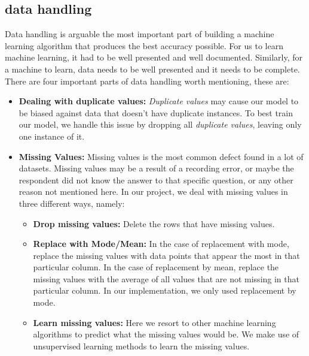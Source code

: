 \subsection{data handling}
Data handling is arguable the most important part of building a machine learning algorithm that produces the best accuracy possible. For us to learn machine learning, it had to be well presented and well documented. Similarly, for a machine to learn, data needs to be well presented and it needs to be complete. There are four important parts of data handling worth mentioning, these are: 
\begin{itemize}
    \item \textbf{Dealing with duplicate values: }\textit{Duplicate values} may cause our model to be biased against data that doesn't have duplicate instances. To best train our model, we handle this issue by dropping all \textit{duplicate values}, leaving only one instance of it.
    \item \textbf{Missing Values: }Missing values is the most common defect found in a lot of datasets. Missing values may be a result of a recording error, or maybe the respondent did not know the answer to that specific question, or any other reason not mentioned here. In our project, we deal with missing values in three different ways, namely:
        \begin{itemize}
            \item \textbf{Drop missing values: }Delete the rows that have missing values.
            \item \textbf{Replace with Mode/Mean: }In the case of replacement with mode, replace the missing values with data points that appear the most in that particular column. In the case of replacement by mean, replace the missing values with the average of all values that are not missing in that particular column. In our implementation, we only used replacement by mode. 
            \item \textbf{Learn missing values: }Here we resort to other machine learning algorithms to predict what the missing values would be. We make use of unsupervised learning methods to learn the missing values.
        

\end{itemize}
\end{itemize}
